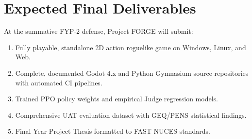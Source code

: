 \section{Expected Final Deliverables}
At the summative FYP-2 defense, Project FORGE will submit:
\begin{enumerate}
    \item Fully playable, standalone 2D action roguelike game on Windows, Linux, and Web.
    \item Complete, documented Godot 4.x and Python Gymnasium source repositories with automated CI pipelines.
    \item Trained PPO policy weights and empirical Judge regression models.
    \item Comprehensive UAT evaluation dataset with GEQ/PENS statistical findings.
    \item Final Year Project Thesis formatted to FAST-NUCES standards.
\end{enumerate}
